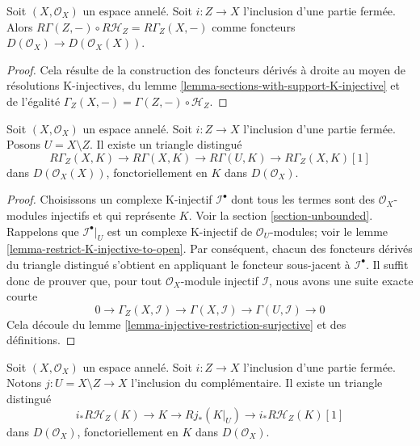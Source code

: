{\begin{lemma}

\label{lemma-local-to-global-sections-with-support}
Soit $(X, \mathcal{O}_X)$ un espace annelé. Soit $i : Z \to X$ l'inclusion d'une partie fermée. Alors $R\Gamma(Z, - ) \circ R\mathcal{H}_Z = R\Gamma_Z(X, - )$ comme foncteurs $D(\mathcal{O}_X) \to D(\mathcal{O}_X(X))$.
\end{lemma}

\begin{proof}
Cela résulte de la construction des foncteurs dérivés à droite au moyen de résolutions K-injectives, du lemme \ref{lemma-sections-with-support-K-injective} et de l'égalité $\Gamma_Z(X, -) = \Gamma(Z, -) \circ \mathcal{H}_Z$.
\end{proof}

\begin{lemma}

\label{lemma-triangle-sections-with-support}
Soit $(X, \mathcal{O}_X)$ un espace annelé. Soit $i : Z \to X$ l'inclusion d'une partie fermée. Posons $U = X \setminus Z$. Il existe un triangle distingué $$
R\Gamma_Z(X, K) \to R\Gamma(X, K) \to R\Gamma(U, K) \to
R\Gamma_Z(X, K)[1]
$$ dans $D(\mathcal{O}_X(X))$, fonctoriellement en $K$ dans $D(\mathcal{O}_X)$.
\end{lemma}

\begin{proof}

Choisissons un complexe K-injectif $\mathcal{I}^\bullet$ dont tous les termes sont des $\mathcal{O}_X$-modules injectifs et qui représente $K$. Voir la section \ref{section-unbounded}. Rappelons que $\mathcal{I}^\bullet|_U$
est un complexe K-injectif de $\mathcal{O}_U$-modules; voir le lemme \ref{lemma-restrict-K-injective-to-open}. Par conséquent, chacun des foncteurs dérivés du triangle distingué s'obtient en appliquant le foncteur sous-jacent à $\mathcal{I}^\bullet$. Il suffit donc de prouver que, pour tout $\mathcal{O}_X$-module injectif $\mathcal{I}$, nous avons une suite exacte courte
$$
0 \to \Gamma_Z(X, \mathcal{I}) \to \Gamma(X, \mathcal{I})
\to \Gamma(U, \mathcal{I}) \to 0
$$
Cela découle du lemme \ref{lemma-injective-restriction-surjective}
et des définitions.

\end{proof}

\begin{lemma}

\label{lemma-triangle-sections-with-support-sheaves}
Soit $(X, \mathcal{O}_X)$ un espace annelé. Soit $i : Z \to X$ l'inclusion d'une partie fermée. Notons $j : U = X \setminus Z \to X$ l'inclusion du complémentaire. Il existe un triangle distingué $$
i_*R\mathcal{H}_Z(K) \to K \to Rj_*(K|_U) \to
i_*R\mathcal{H}_Z(K)[1]
$$ dans $D(\mathcal{O}_X)$, fonctoriellement en $K$ dans $D(\mathcal{O}_X)$.
\end{lemma}

}
